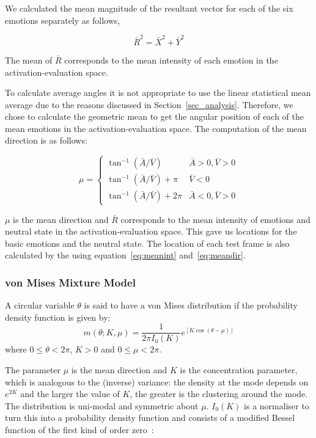 \documentclass[10pt,journal,cspaper,compsoc]{IEEEtran}
\begin{document}
We calculated the mean magnitude of the resultant vector for each of the six emotions separately as follows,

\begin{equation}
\label{eq:meanint}
\bar{R}^{2}=\bar{X}^{2} + \bar{Y}^{2}
\end{equation}

The mean of $\bar{R}$ corresponds to the mean intensity of each emotion in the activation-evaluation space.

To calculate average angles it is not appropriate to use the linear statistical mean average due to the reasons discussed in Section~\ref{sec_analysis}. Therefore, we chose to calculate the geometric mean to get the angular position of each of the mean emotions in the activation-evaluation space. The computation of the mean direction is as follows:

\begin{equation}
\label{eq:meandir}
\mu= \left\{ \begin{array}{ll}
\tan^{-1}(\bar{A}/\bar{V}) & \bar{A}>0, \bar{V}>0 \\ 
\tan^{-1}(\bar{A}/\bar{V})+\pi & \bar{V}<0 \\ 
\tan^{-1}(\bar{A}/\bar{V})+2\pi & \bar{A}<0, \bar{V}>0
\end{array}\right.
\end{equation}

$\mu$ is the mean direction and $\bar{R}$ corresponds to the mean intensity of emotions and neutral state in the activation-evaluation space. This gave us locations for the basic emotions and the neutral state. The location of each test frame is also calculated by the using equation~\ref{eq:meanint} and~\ref{eq:meandir}.

\subsubsection{von Mises Mixture Model}
\label{sec_von_Mises}

A circular variable $\theta$ is said to have a von Mises distribution if the probability density function is given by:
\begin{equation}
m(\theta;K,\mu) = \frac {1}{2 \pi I_{0} (K)} e^{[K\cos (\theta - \mu)]}
\end{equation}
where $0 \leq \theta < 2 \pi$, $K > 0$ and $0\leq\mu<2\pi$.

The parameter $\mu$ is the mean direction and $K$ is the concentration parameter, which is analogous to the (inverse) variance: the density at the mode depends on $e^{2K}$ and the larger the value of $K$, the greater is the clustering around the mode. The distribution is uni-modal and symmetric about $\mu$. $I_{0}(K)$ is a normaliser to turn this into a probability density function and consists of a modified Bessel function of the first kind of order zero~\cite{chang1996computation}:
\end{document}
